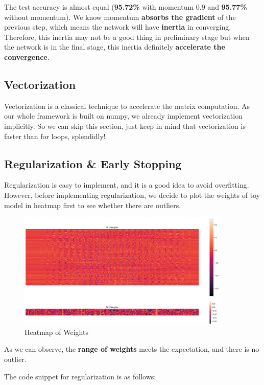 \documentclass[a4paper, 11pt]{article} %
\begin{document}
The test accuracy is almost equal (\textbf{95.72\%} with momentum 0.9 and \textbf{95.77\%}
without momentum). We know momentum \textbf{absorbs the gradient} of the previous step,
which means the network will have \textbf{inertia} in converging. Therefore, this inertia
may not be a good thing in preliminary stage but when the network is in the final stage,
this inertia definitely \textbf{accelerate the convergence}.

\subsection{\textbf{Vectorization}}

Vectorization is a classical technique to accelerate the matrix computation. As our whole
framework is built on numpy, we already implement vectorization implicitly. So we can skip
this section, just keep in mind that vectorization is faster than for loops, splendidly!

\subsection{\textbf{Regularization \& Early Stopping}}

Regularization is easy to implement, and it is a good idea to avoid overfitting. However,
before implementing regularization, we decide to plot the weights of toy model in heatmap
first to see whether there are outliers.

\begin{figure}[H]
    \centering
    \includegraphics[width=0.9\textwidth]{./img/hearmap.png}
    \caption{Heatmap of Weights}
\end{figure}

As we can observe, the \textbf{range of weights} meets the expectation, and there is no
outlier.

The code snippet for regularization is as follows:
\end{document}
